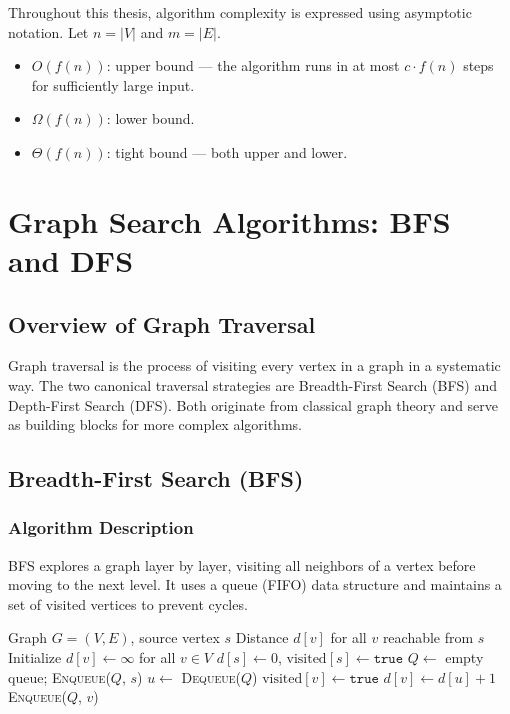 \documentclass[12pt, a4paper, oneside]{report}
\theoremstyle{definition}
\begin{document}
Throughout this thesis, algorithm complexity is expressed using asymptotic notation. Let $n = |V|$ and $m = |E|$.

\begin{itemize}
    \item $O(f(n))$: upper bound — the algorithm runs in at most $c \cdot f(n)$ steps for sufficiently large input.
    \item $\Omega(f(n))$: lower bound.
    \item $\Theta(f(n))$: tight bound — both upper and lower.
\end{itemize}

\chapter{Graph Search Algorithms: BFS and DFS}

\section{Overview of Graph Traversal}

Graph traversal is the process of visiting every vertex in a graph in a systematic way. The two canonical traversal strategies are Breadth-First Search (BFS) and Depth-First Search (DFS). Both originate from classical graph theory and serve as building blocks for more complex algorithms.

\section{Breadth-First Search (BFS)}

\subsection{Algorithm Description}

BFS explores a graph layer by layer, visiting all neighbors of a vertex before moving to the next level. It uses a queue (FIFO) data structure and maintains a set of visited vertices to prevent cycles.

\begin{algorithm}[H]
\caption{Breadth-First Search}
\label{alg:bfs}
\begin{algorithmic}[1]
\Require Graph $G = (V, E)$, source vertex $s$
\Ensure Distance $d[v]$ for all $v$ reachable from $s$
\State Initialize $d[v] \gets \infty$ for all $v \in V$
\State $d[s] \gets 0$, $\text{visited}[s] \gets \texttt{true}$
\State $Q \gets$ empty queue; \textsc{Enqueue}($Q$, $s$)
    \State $u \gets$ \textsc{Dequeue}($Q$)
            \State $\text{visited}[v] \gets \texttt{true}$
            \State $d[v] \gets d[u] + 1$
            \State \textsc{Enqueue}($Q$, $v$)
        \EndIf
    \EndFor
\EndWhile
\end{algorithmic}
\end{algorithm}
\end{document}
